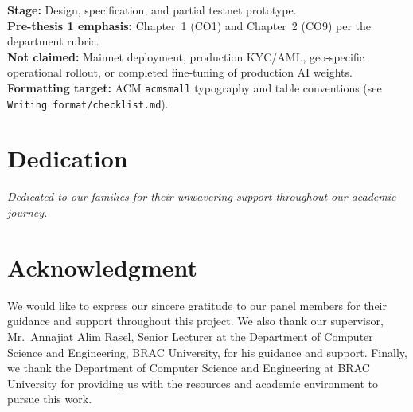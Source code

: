 \documentclass[12pt,a4paper]{report}  %
\begin{document}
\noindent\textbf{Stage:} Design, specification, and partial testnet prototype.\\
\noindent\textbf{Pre-thesis 1 emphasis:} Chapter~1 (CO1) and Chapter~2 (CO9) per the department rubric.\\
\noindent\textbf{Not claimed:} Mainnet deployment, production KYC/AML, geo-specific operational rollout, or completed fine-tuning of production AI weights.\\
\noindent\textbf{Formatting target:} ACM \texttt{acmsmall} typography and table conventions (see \texttt{Writing format/checklist.md}).

\newpage
\thispagestyle{empty}

\chapter*{Dedication}
{}

\vspace{3cm}
\begin{center}
\textit{Dedicated to our families for their unwavering support throughout our academic journey.}
\end{center}

\newpage
\thispagestyle{empty}

\chapter*{Acknowledgment}
{}

We would like to express our sincere gratitude to our panel members for their guidance and support throughout this project. We also thank our supervisor, Mr.\ Annajiat Alim Rasel, Senior Lecturer at the Department of Computer Science and Engineering, BRAC University, for his guidance and support. Finally, we thank the Department of Computer Science and Engineering at BRAC University for providing us with the resources and academic environment to pursue this work.

\newpage
\setcounter{page}{1}
\tableofcontents
\newpage
{}
{}
\begingroup
\let\oldnumberline\numberline
\renewcommand{\numberline}[1]{\oldnumberline{#1}\hspace{0.75em}}
\listoftables
\endgroup
\newpage
{}
{}
\begingroup
\let\oldnumberline\numberline
\renewcommand{\numberline}[1]{\oldnumberline{#1}\hspace{0.75em}}
\listoffigures
\endgroup
\newpage
\end{document}
